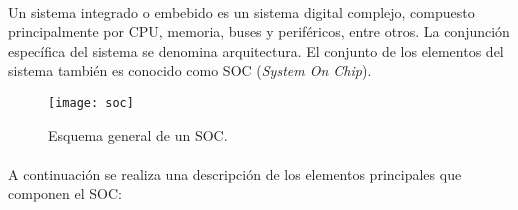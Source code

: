 \paragraph{}
Un sistema integrado o embebido es un sistema digital complejo, compuesto principalmente por CPU, memoria, buses y perif\'ericos, entre otros. La conjunción específica del sistema se denomina arquitectura. El conjunto de los elementos del sistema tambi\'en es conocido como SOC (\textit{System On Chip}).
\begin{figure}[h]
    \centering
    \texttt{[image: soc]}
    \caption{Esquema general de un SOC.} 
    \label{fig:soc}
\end{figure}
\paragraph{}
A continuaci\'on se realiza una descripción de los elementos principales que componen el SOC:
